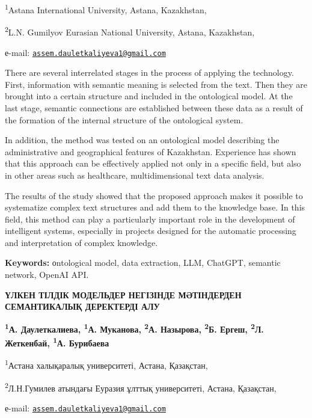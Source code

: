 \begin{affiliation}
\textsuperscript{1}Astana International University, Astana, Kazakhstan,

\textsuperscript{2}L.N. Gumilyov Eurasian National University, Astana, Kazakhstan,

е-mail: \href{mailto:assem.dauletkaliyeva1@gmail.com}{\nolinkurl{assem.dauletkaliyeva1@gmail.com}}
\end{affiliation}

There are several interrelated stages in the process of applying the
technology. First, information with semantic meaning is selected from
the text. Then they are brought into a certain structure and included in
the ontological model. At the last stage, semantic connections are
established between these data as a result of the formation of the
internal structure of the ontological system.

In addition, the method was tested on an ontological model describing
the administrative and geographical features of Kazakhstan. Experience
has shown that this approach can be effectively applied not only in a
specific field, but also in other areas such as healthcare,
multidimensional text data analysis.

The results of the study showed that the proposed approach makes it
possible to systematize complex text structures and add them to the
knowledge base. In this field, this method can play a particularly
important role in the development of intelligent systems, especially in
projects designed for the automatic processing and interpretation of
complex knowledge.

{\bfseries Keywords:} оntological model, data extraction, LLM, ChatGPT,
semantic network, OpenAI API.

\begin{articleheader}
{\bfseries ҮЛКЕН ТІЛДІК МОДЕЛЬДЕР НЕГІЗІНДЕ МӘТІНДЕРДЕН СЕМАНТИКАЛЫҚ ДЕРЕКТЕРДІ АЛУ}

{\bfseries
\textsuperscript{1}А. Даулеткалиева\textsuperscript{\envelope },
\textsuperscript{1}А. Муканова,
\textsuperscript{2}А. Назырова,
\textsuperscript{2}Б. Ергеш,
\textsuperscript{2}Л. Жеткенбай,
\textsuperscript{1}А. Бурибаева
}
\end{articleheader}

\begin{affiliation}
\textsuperscript{1}Астана халықаралық университеті, Астана, Қазақстан,

\textsuperscript{2}Л.Н.Гумилев атындағы Еуразия ұлттық университеті, Астана, Қазақстан,

е-mail: \href{mailto:assem.dauletkaliyeva1@gmail.com}{\nolinkurl{assem.dauletkaliyeva1@gmail.com}}
\end{affiliation}

